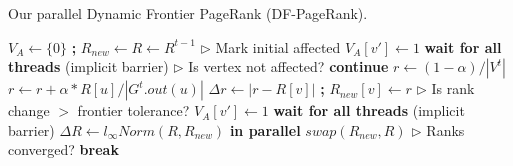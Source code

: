 \begin{algorithm}[!hbt]
\caption{Our parallel Dynamic Frontier PageRank (DF-PageRank).}
\label{alg:prdf}
\begin{algorithmic}[1]

\Statex

  \State $V_A \gets \{0\}$ \textbf{;} $R_{new} \gets R \gets R^{t-1}$
  \State $\rhd$ Mark initial affected
   \label{alg:with-barrier--mark-begin}
    \State $V_A[v'] \gets 1$
    \EndFor
  \EndFor \label{alg:with-barrier--mark-end}
  \State \textbf{wait for all threads} (implicit barrier)
  \ForAll{$i \in [0 .. MAX\_ITERATIONS)$} \label{alg:with-barrier--compute-begin}
      \State $\rhd$ Is vertex not affected?
       \textbf{continue}
      \EndIf
      \State $r \gets (1 - \alpha)/|V^t|$
        \State $r \gets r + \alpha * R[u] / |G^t.out(u)|$
      \EndFor
      \State $\Delta r \gets |r - R[v]|$ \textbf{;} $R_{new}[v] \gets r$
      \State $\rhd$ Is rank change $>$ frontier tolerance?
       \label{alg:with-barrier--remark-begin}
         $V_A[v'] \gets 1$
        \EndFor
      \EndIf \label{alg:with-barrier--remark-end}
    \EndFor
    \State \textbf{wait for all threads} (implicit barrier)
    \State $\Delta R \gets l_\infty Norm(R, R_{new})$ \textbf{in parallel}
    \State $swap(R_{new}, R)$
    \State $\rhd$ Ranks converged?
     \textbf{break}
    \EndIf
  \EndFor \label{alg:with-barrier--compute-end}
  \State {}
\EndFunction
\end{algorithmic}
\end{algorithm}





